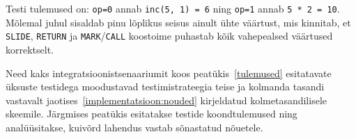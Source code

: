 Testi tulemused on: \texttt{op=0} annab \texttt{inc(5, 1) = 6} ning \texttt{op=1} annab \texttt{5 * 2 = 10}. Mõlemal juhul sisaldab pinu lõplikus seisus ainult ühte väärtust, mis kinnitab, et \texttt{SLIDE}, \texttt{RETURN} ja \texttt{MARK}/\texttt{CALL} koostoime puhastab kõik vahepealsed väärtused korrektselt.

Need kaks integratsioonistsenaariumit koos peatükis~\ref{tulemused} esitatavate üksuste testidega moodustavad testimistrateegia teise ja kolmanda tasandi vastavalt jaotises~\ref{implementatsioon:nouded} kirjeldatud kolmetasandilisele skeemile. Järgmises peatükis esitatakse testide koondtulemused ning analüüsitakse, kuivõrd lahendus vastab sõnastatud nõuetele.